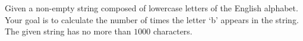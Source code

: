 
Given a non-empty string composed of lowercase letters of the English alphabet.
Your goal is to calculate the number of times the letter `b' appears in the string.
The given string has no more than $1000$ characters.